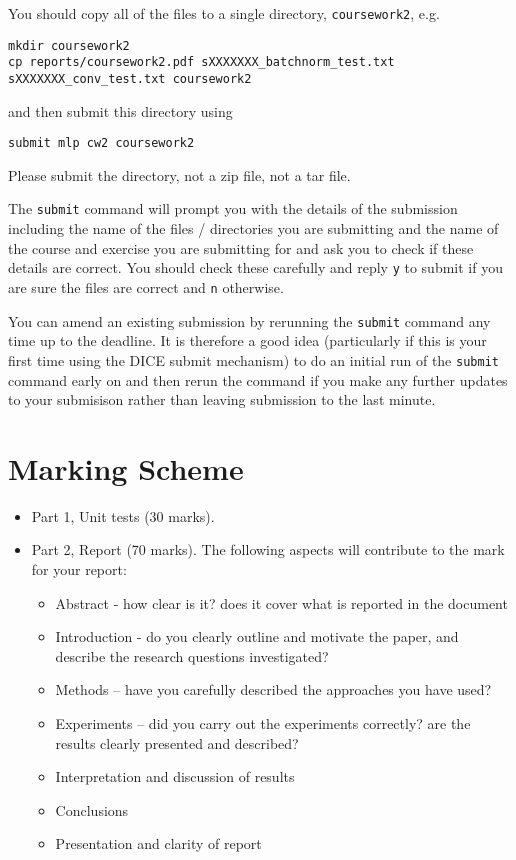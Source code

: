 \documentclass[11pt,]{article}
\begin{document}
You should copy all of the files to a single directory, \verb+coursework2+, e.g.

\begin{verbatim}
mkdir coursework2
cp reports/coursework2.pdf sXXXXXXX_batchnorm_test.txt sXXXXXXX_conv_test.txt coursework2
\end{verbatim}


and then submit this directory using

\begin{verbatim}
submit mlp cw2 coursework2
\end{verbatim}

Please submit the directory, not a zip file, not a tar file.

The \texttt{submit} command will prompt you with the details of the
submission including the name of the files / directories you are
submitting and the name of the course and exercise you are submitting
for and ask you to check if these details are correct. You should check
these carefully and reply \texttt{y} to submit if you are sure the files
are correct and \texttt{n} otherwise.

You can amend an existing submission by rerunning the \texttt{submit}
command any time up to the deadline. It is therefore a good idea
(particularly if this is your first time using the DICE submit
mechanism) to do an initial run of the \texttt{submit} command early on
and then rerun the command if you make any further updates to your
submisison rather than leaving submission to the last minute.


\section{Marking Scheme}
\label{sec:marking-scheme}

\begin{itemize}
\item
  Part 1, Unit tests (30 marks).
\item
  Part 2, Report (70 marks).  The following aspects will contribute to the mark for your report:
  \begin{itemize}
    \item Abstract - how clear is it? does it cover what is reported in the document
    \item Introduction - do you clearly outline and motivate the paper, and describe the research questions investigated?
    \item Methods -- have you carefully described the approaches you have used?
    \item Experiments -- did you carry out the experiments correctly?  are the results clearly presented and described?  
    \item Interpretation and discussion of results
    \item Conclusions
    \item Presentation and clarity of report 
  \end{itemize}
\end{itemize}



\end{document}
